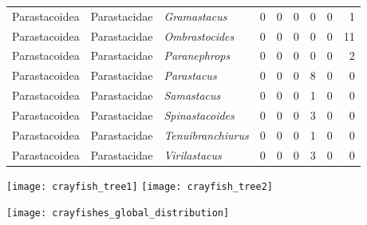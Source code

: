 \documentclass[11pt]{article}
\begin{document}
\begin{longtable}[l]{@{}lllrrrrrr@{}}
Parastacoidea & Parastacidae & \emph{Gramastacus} & 0 & 0 & 0 & 0 & 0 &
1\tabularnewline
Parastacoidea & Parastacidae & \emph{Ombrastocides} & 0 & 0 & 0 & 0 & 0
& 11\tabularnewline
Parastacoidea & Parastacidae & \emph{Paranephrops} & 0 & 0 & 0 & 0 & 0 &
2\tabularnewline
Parastacoidea & Parastacidae & \emph{Parastacus} & 0 & 0 & 0 & 8 & 0 &
0\tabularnewline
Parastacoidea & Parastacidae & \emph{Samastacus} & 0 & 0 & 0 & 1 & 0 &
0\tabularnewline
Parastacoidea & Parastacidae & \emph{Spinastacoides} & 0 & 0 & 0 & 3 & 0
& 0\tabularnewline
Parastacoidea & Parastacidae & \emph{Tenuibranchiurus} & 0 & 0 & 0 & 1 &
0 & 0\tabularnewline
Parastacoidea & Parastacidae & \emph{Virilastacus} & 0 & 0 & 0 & 3 & 0 &
0\tabularnewline
\bottomrule
\end{longtable}

\newpage
{}

\texttt{[image: crayfish\_tree1]} \texttt{[image: crayfish\_tree2]}

\newpage
\restoregeometry
\texttt{[image: crayfishes\_global\_distribution]}
\end{document}
